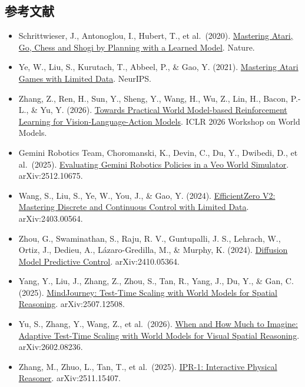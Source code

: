 \hypertarget{ux53c2ux8003ux6587ux732e-201}{%
\subsection{参考文献}\label{ux53c2ux8003ux6587ux732e-201}}

\begin{itemize}
\tightlist
\item
  Schrittwieser, J., Antonoglou, I., Hubert, T., et al.~(2020). \href{https://www.nature.com/articles/s41586-020-03051-4}{Mastering Atari, Go, Chess and Shogi by Planning with a Learned Model}. Nature.
\item
  Ye, W., Liu, S., Kurutach, T., Abbeel, P., \& Gao, Y. (2021). \href{https://arxiv.org/abs/2111.00210}{Mastering Atari Games with Limited Data}. NeurIPS.
\item
  Zhang, Z., Ren, H., Sun, Y., Sheng, Y., Wang, H., Wu, Z., Lin, H., Bacon, P.-L., \& Yu, Y. (2026). \href{https://openreview.net/forum?id=gB1yFEd106}{Towards Practical World Model-based Reinforcement Learning for Vision-Language-Action Models}. ICLR 2026 Workshop on World Models.
\item
  Gemini Robotics Team, Choromanski, K., Devin, C., Du, Y., Dwibedi, D., et al.~(2025). \href{https://arxiv.org/abs/2512.10675}{Evaluating Gemini Robotics Policies in a Veo World Simulator}. arXiv:2512.10675.
\item
  Wang, S., Liu, S., Ye, W., You, J., \& Gao, Y. (2024). \href{https://arxiv.org/abs/2403.00564}{EfficientZero V2: Mastering Discrete and Continuous Control with Limited Data}. arXiv:2403.00564.
\item
  Zhou, G., Swaminathan, S., Raju, R. V., Guntupalli, J. S., Lehrach, W., Ortiz, J., Dedieu, A., Lázaro-Gredilla, M., \& Murphy, K. (2024). \href{https://arxiv.org/abs/2410.05364}{Diffusion Model Predictive Control}. arXiv:2410.05364.
\item
  Yang, Y., Liu, J., Zhang, Z., Zhou, S., Tan, R., Yang, J., Du, Y., \& Gan, C. (2025). \href{https://arxiv.org/abs/2507.12508}{MindJourney: Test-Time Scaling with World Models for Spatial Reasoning}. arXiv:2507.12508.
\item
  Yu, S., Zhang, Y., Wang, Z., et al.~(2026). \href{https://arxiv.org/abs/2602.08236}{When and How Much to Imagine: Adaptive Test-Time Scaling with World Models for Visual Spatial Reasoning}. arXiv:2602.08236.
\item
  Zhang, M., Zhuo, L., Tan, T., et al.~(2025). \href{https://arxiv.org/abs/2511.15407}{IPR-1: Interactive Physical Reasoner}. arXiv:2511.15407.
\end{itemize}

